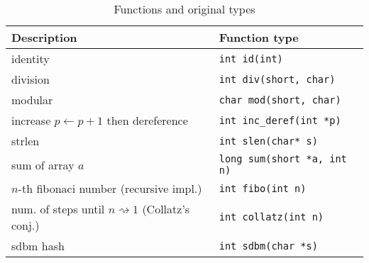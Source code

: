\documentclass[a4paper]{llncs}
\begin{document}
\begin{table}
	\begin{center}
		\caption{Functions and original types}\label{description}
		\begin{tabular}{|l|l|}
			\hline
			Description & Function type \\
			\hline
			identity & \texttt{int id(int)} \\
			\hline
			division & \texttt{int div(short, char)} \\
			\hline
			modular & \texttt{char mod(short, char)} \\
			\hline
			increase $p \leftarrow p + 1$ then dereference & \texttt{int inc\_deref(int *p)} \\
			\hline
			strlen  & \texttt{int slen(char* s)} \\
			\hline
			sum of array $a$ & \texttt{long sum(short *a, int n)} \\
			\hline
			$n$-th fibonaci number (recursive impl.) & \texttt{int fibo(int n)} \\
			\hline
			num. of steps until $n \rightsquigarrow 1$ (Collatz's conj.)  & \texttt{int collatz(int n)} \\
			\hline
			sdbm hash & \texttt{int sdbm(char *s)} \\
			\hline
		\end{tabular}
	\end{center}
\end{table}
\end{document}
